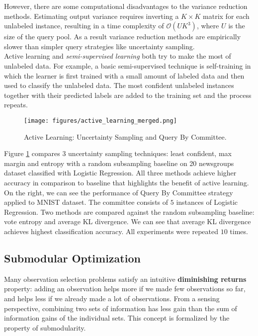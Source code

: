 However, there are some computational disadvantages to the variance reduction methods. Estimating output variance requires inverting a $K\times K$ matrix for each unlabeled instance, resulting in a time complexity of $\mathcal{O}(UK^{3})$, where $U$ is the size of the query pool. As a result variance reduction methods are empirically slower than simpler query strategies like uncertainty sampling.\\  

Active learning and \textit{semi-supervised learning} both try to make the most of unlabeled data. For example, a basic semi-supervised technique is self-training in which the learner is first trained with a small amount of labeled data and then used to classify the unlabeled data. The most confident unlabeled instances together with their predicted labels are added to the training set and the process repeats.\\ 

\begin{figure}[tbhp]
    \centering
    \texttt{[image: figures/active\_learning\_merged.png]}
    \caption{Active Learning: Uncertainty Sampling and Query By Committee.}
    \label{fig:al_merged}
\end{figure}

Figure \ref{fig:al_merged} compares $3$ uncertainty sampling techniques: least confident, max margin and entropy with a random subsampling baseline on 20 newsgroups dataset classified with Logistic Regression. All three methods achieve higher accuracy in comparison to baseline that highlights the benefit of active learning. On the right, we can see the performance of Query By Committee strategy applied to MNIST dataset. The committee consists of $5$ instances of Logistic Regression. Two methods are compared against the random subsampling baseline: vote entropy and average KL divergence. We can see that average KL divergence achieves highest classification accuracy. All experiments were repeated $10$ times.  


\subsection{Submodular Optimization}

Many observation selection problems satisfy an intuitive \textbf{diminishing returns} property: adding an observation helps more if we made few observations so far, and helps less if we already made a lot of observations. From a sensing perspective, combining two sets of information has less gain than the sum of information gains of the individual sets. This concept is formalized by the property of submodularity.\\

